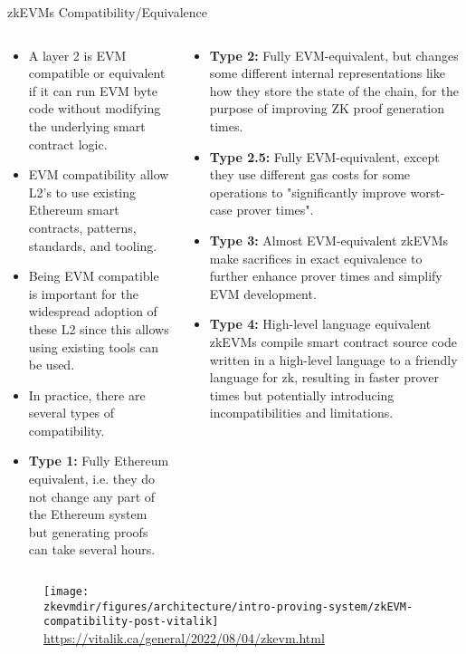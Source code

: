 \begin{frame}{zkEVMs Compatibility/Equivalence}
\begin{columns}
\begin{column}{0.46\textwidth}
\begin{itemize}
\footnotesize
\item A layer 2 is EVM compatible or equivalent if it can run EVM byte code without modifying the underlying smart contract logic. 
\item EVM compatibility allow L2's to use existing Ethereum smart contracts, patterns, standards, and tooling.
\item Being EVM compatible is important for the widespread adoption of these L2 since this allows using existing tools can be used.
\item In practice, there are several types of compatibility.
\item \textbf{Type 1:} Fully Ethereum equivalent, i.e. they do not change any part of the Ethereum system but generating proofs
can take several hours.
\end{itemize}
\end{column}
\begin{column}{0.51\textwidth}
\begin{itemize}
\footnotesize
\item \textbf{Type 2:} Fully EVM-equivalent, but changes some different internal representations like how they store the state of the chain, for the purpose of improving ZK proof generation times.
\item \textbf{Type 2.5:} Fully EVM-equivalent, except they use different gas costs for some operations to "significantly improve worst-case prover times".
\item \textbf{Type 3:} Almost EVM-equivalent zkEVMs make sacrifices in exact equivalence to further enhance prover times and simplify EVM development.
\item \textbf{Type 4:} High-level language equivalent zkEVMs compile smart contract source code written in a high-level language to a friendly language for zk, resulting in faster prover times but potentially introducing incompatibilities and limitations.
\end{itemize}
\end{column}
\end{columns}




\framebreak
\begin{figure}
\texttt{[image: \\zkevmdir/figures/architecture/intro-proving-system/zkEVM-compatibility-post-vitalik]}
\footnotesize
\url{https://vitalik.ca/general/2022/08/04/zkevm.html}
\end{figure}
\end{frame}






